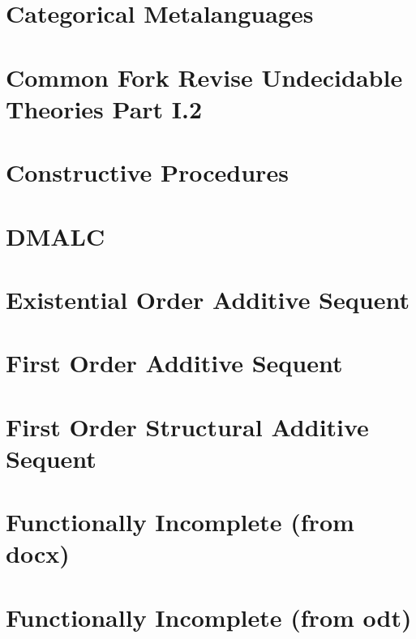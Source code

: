 \documentclass{report}
\begin{document}
\chapter{Categorical Metalanguages}


\chapter{Common Fork Revise Undecidable Theories Part I.2}


\chapter{Constructive Procedures}


\chapter{DMALC}


\chapter{Existential Order Additive Sequent}


\chapter{First Order Additive Sequent}


\chapter{First Order Structural Additive Sequent}


\chapter{Functionally Incomplete (from docx)}


\chapter{Functionally Incomplete (from odt)}

\end{document}
